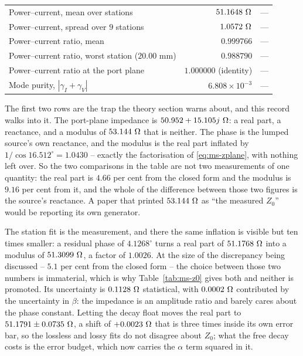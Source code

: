 \begin{table}[H]
\begin{tabular}{@{}>{\raggedright\arraybackslash}p{}rr@{}}
    Power--current, mean over stations                     & $51.1648\ \Ohm$             & --- \\
    Power--current, spread over $9$ stations               & $1.0572\ \Ohm$              & --- \\
    Power--current ratio, mean                             & $0.999766$                  & --- \\
    Power--current ratio, worst station ($20.00$ mm)       & $0.988790$                  & --- \\
    Power--current ratio at the port plane                 & $1.000000$ (identity)       & --- \\
    Mode purity, $|\gamma_I + \gamma_V|$                   & $6.808\times10^{-3}$        & --- \\
    \bottomrule
  \end{tabular}
\end{table}

The first two rows are the trap the theory section warns about, and this record walks into it. The port-plane
impedance is $50.952 + 15.105j\ \Omega$: a real part, a reactance, and a modulus of $53.144\ \Ohm$ that is neither.
The phase is the lumped source's own reactance, and the modulus is the real part inflated by
$1/\cos 16.512^\circ = 1.0430$ -- exactly the factorisation of \eqref{eq:ms-zplane}, with nothing left over. So
the two comparisons in the table are not two measurements of one quantity: the real part is $4.66$ per cent from
the closed form and the modulus is $9.16$ per cent from it, and the whole of the difference between those two
figures is the source's reactance. A paper that printed $53.144\ \Ohm$ as ``the measured $Z_0$'' would be
reporting its own generator.

The station fit is the measurement, and there the same inflation is visible but ten times smaller: a residual
phase of $4.1268^\circ$ turns a real part of $51.1768\ \Omega$ into a modulus of $51.3099\ \Omega$, a factor of
$1.0026$. At the size of the discrepancy being discussed -- $5.1$ per cent from the closed form -- the choice
between those two numbers is immaterial, which is why Table~\ref{tab:ms-z0} gives both and neither is promoted.
Its uncertainty is $0.1128\ \Omega$ statistical, with $0.0002\ \Omega$ contributed by the uncertainty in $\beta$: the
impedance is an amplitude ratio and barely cares about the phase constant. Letting the decay float moves the real
part to $51.1791 \pm 0.0735\ \Omega$, a shift of $+0.0023\ \Omega$ that is three times inside its own error bar, so
the lossless and lossy fits do not disagree about $Z_0$; what the free decay costs is the error budget, which now
carries the $\alpha$ term squared in it.

